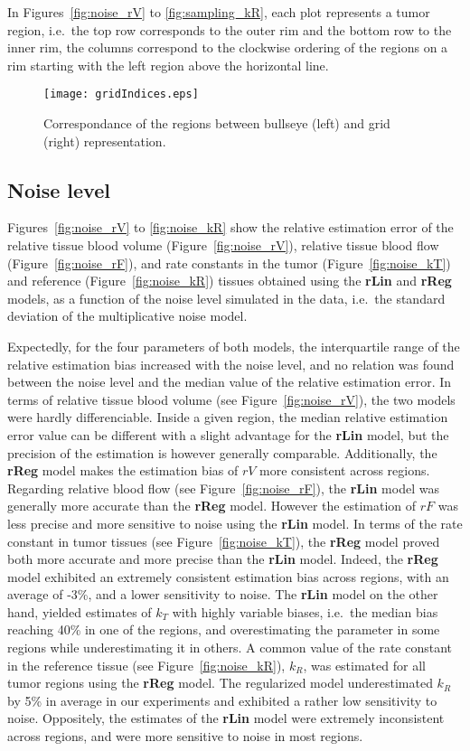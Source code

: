 In Figures~\ref{fig:noise_rV} to \ref{fig:sampling_kR}, each plot represents a tumor region, i.e.~the top row corresponds to the outer rim and the bottom row to the inner rim, the columns correspond to the clockwise ordering of the regions on a rim starting with the left region above the horizontal line.

\begin{figure}
\texttt{[image: gridIndices.eps]}
\caption{Correspondance of the regions between bullseye (left) and grid (right) representation.}
\label{fig:gridIndices}
\end{figure}
\FloatBarrier

\subsection{Noise level}
Figures~\ref{fig:noise_rV} to \ref{fig:noise_kR} show the relative estimation error of the relative tissue blood volume (Figure~\ref{fig:noise_rV}), relative tissue blood flow (Figure~\ref{fig:noise_rF}), and rate constants in the tumor (Figure~\ref{fig:noise_kT}) and reference  (Figure~\ref{fig:noise_kR}) tissues obtained using the \textbf{rLin} and \textbf{rReg} models, as a function of the noise level simulated in the data, i.e.~the standard deviation of the multiplicative noise model.

Expectedly, for the four parameters of both models, the interquartile range of the relative estimation bias increased with the noise level, and no relation was found between the noise level and the median value of the relative estimation error.
In terms of relative tissue blood volume (see Figure~\ref{fig:noise_rV}), the two models were hardly differenciable.
Inside a given region, the median relative estimation error value can be different with a slight advantage for the \textbf{rLin} model, but the precision of the estimation is however generally comparable.
Additionally, the \textbf{rReg} model makes the estimation bias of $rV$ more consistent across regions.
Regarding relative blood flow (see Figure~\ref{fig:noise_rF}), the \textbf{rLin} model was generally more accurate than the \textbf{rReg} model. 
However the estimation of $rF$ was less precise and more sensitive to noise using the \textbf{rLin} model.
In terms of the rate constant in tumor tissues (see Figure~\ref{fig:noise_kT}), the \textbf{rReg} model proved both more accurate and more precise than the \textbf{rLin} model.
Indeed, the \textbf{rReg} model exhibited an extremely consistent estimation bias across regions, with an average of -3\%, and a lower sensitivity to noise.
The \textbf{rLin} model on the other hand, yielded estimates of $k_T$ with highly variable biases, i.e.~the median bias reaching 40\% in one of the regions, and overestimating the parameter in some regions while underestimating it in others.
A common value of the rate constant in the reference tissue (see Figure~\ref{fig:noise_kR}), $k_R$, was estimated for all tumor regions using the \textbf{rReg} model.
The regularized model underestimated $k_R$ by 5\% in average in our experiments and exhibited a rather low sensitivity to noise. 
Oppositely, the estimates of the \textbf{rLin} model were extremely inconsistent across regions, and were more sensitive to noise in most regions.

